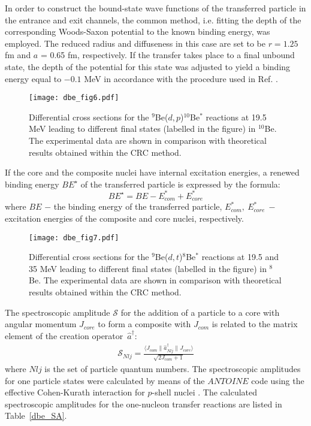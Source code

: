 \documentclass[
12pt, %
oneside, %
english, %
onehalfspacing, %
onehalfspacing, %
headsepline, %
]{MastersDoctoralThesis} %
\begin{document}
In order to construct the bound-state wave functions of the transferred particle in the entrance and exit channels, the common method, i.e. fitting the depth of the corresponding Woods-Saxon potential to the known binding energy, was employed. The reduced radius and diffuseness in this case are set to be $r = 1.25$ fm and $a$ = 0.65 fm, respectively. If the transfer takes place to a final unbound state, the depth of the potential for this state was adjusted to yield a binding energy equal to $-0.1$ MeV in accordance with the procedure used in Ref. \cite{harakeh1980strong}.

\begin{figure}[tp]
\centering
\texttt{[image: dbe\_fig6.pdf]}
\decoRule
\caption{\label{dbe_fig6} \footnotesize Differential cross sections for the ${}^9$Be($d,p$)${}^{10}$Be$^*$ reactions at 19.5 MeV leading to different final states (labelled in the figure) in ${}^{10}$Be. The experimental data are shown in comparison with theoretical results obtained within the CRC method.}
\end{figure}

If the core and the composite nuclei have internal excitation energies, a renewed binding energy $BE^{\star}$ of the transferred particle is expressed by the formula:
\begin{equation} BE^{\star}=BE - E_{com}^*+E_{core}^* \end{equation}
where $BE$ $-$ the binding energy of the transferred particle, $E_{com}^*,~E_{core}^*~-$  excitation energies of the composite and  core nuclei, respectively.

\begin{figure}[tp]
\centering
\texttt{[image: dbe\_fig7.pdf]}
\decoRule
\caption{
\label{dbe_fig7}
\footnotesize Differential cross sections for the ${}^9$Be($d,t$)${}^{8}$Be$^*$ reactions at 19.5 and 35 MeV leading to different final states (labelled in the figure) in ${}^{8}$Be. The experimental data are shown in comparison with  theoretical results obtained within the CRC method.}
\end{figure}

The spectroscopic amplitude  $\mathcal{S}$ for the addition of a particle to a core with angular momentum $J_{core}$ to form a composite with $J_{com}$ is related to the matrix element of the creation operator~$\hat{a}^\dagger$:
\begin{eqnarray}\label{eq:SA}
\mathcal{S}_{Nlj} = \frac{\langle J_{com} \| \hat{a}^\dagger _{Nlj} \| J_{core}  \rangle}{\sqrt{2J_{com}+1}}
\end{eqnarray}
where $Nlj$ is the set of particle quantum numbers. The spectroscopic amplitudes for one particle states were calculated by means of the $ANTOINE$ code \cite{antoine}  using the effective Cohen-Kurath interaction for $p$-shell nuclei \cite{cohen1965}. The calculated spectroscopic amplitudes for the one-nucleon transfer reactions are listed in Table~\ref{dbe_SA}.
\end{document}
